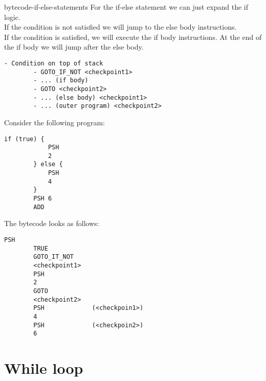 \documentclass[preview]{standalone}
\begin{document}
\begin{snippet}{bytecode-if-else-statements}
    For the if-else statement we can just expand the if logic.
    \\
    If the condition is not satisfied we will jump to the else body instructions.
    \\
    If the condition is satisfied, we will execute the if body instructions. At the end of the if body
    we will jump after the else body.

    \begin{lstlisting}[style=generic]
        - Condition on top of stack
        - GOTO_IF_NOT <checkpoint1>
        - ... (if body)
        - GOTO <checkpoint2>
        - ... (else body) <checkpoint1>
        - ... (outer program) <checkpoint2>
    \end{lstlisting}

    Consider the following program:

    \begin{lstlisting}[style=generic]
        if (true) {
            PSH
            2
        } else {
            PSH
            4
        }
        PSH 6
        ADD
    \end{lstlisting}

    The bytecode looks as follows:

    \begin{lstlisting}[style=generic]
        PSH
        TRUE
        GOTO_IT_NOT
        <checkpoint1>
        PSH
        2
        GOTO
        <checkpoint2>
        PSH             (<checkpoin1>)
        4
        PSH             (<checkpoin2>)
        6
    \end{lstlisting}
\end{snippet}

\section{While loop}
\end{document}
